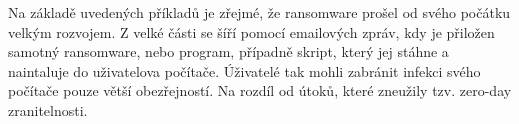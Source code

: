 \documentclass[a4paper,12pt]{article}
\begin{document}



\begin{figure}[h!]
\end{figure}


Na základě uvedených příkladů je zřejmé, že ransomware prošel od svého počátku velkým rozvojem. Z velké části se šíří pomocí emailových zpráv, kdy je přiložen samotný ransomware, nebo program, případně skript, který jej stáhne a naintaluje do uživatelova počítače. Úživatelé tak mohli zabránit infekci svého počítače pouze větší obezřejností. Na rozdíl od útoků, které zneužily tzv. zero-day zranitelnosti.
\end{document}
